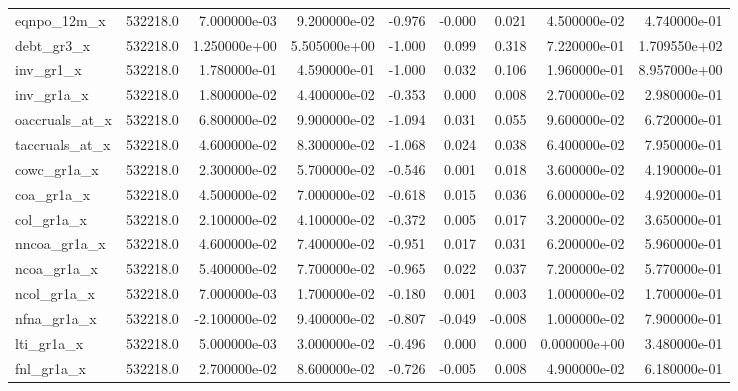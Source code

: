 \documentclass[12pt]{article}
\begin{document}
\begin{landscape}
\begin{longtable}{|l|r|r|r|r|r|r|r|r|}
		eqnpo\_12m\_x            & 532218.0 & 7.000000e-03  & 9.200000e-02 & -0.976     & -0.000      & 0.021       & 4.500000e-02  & 4.740000e-01 \\
		debt\_gr3\_x             & 532218.0 & 1.250000e+00  & 5.505000e+00 & -1.000     & 0.099       & 0.318       & 7.220000e-01  & 1.709550e+02 \\
		inv\_gr1\_x              & 532218.0 & 1.780000e-01  & 4.590000e-01 & -1.000     & 0.032       & 0.106       & 1.960000e-01  & 8.957000e+00 \\
		inv\_gr1a\_x             & 532218.0 & 1.800000e-02  & 4.400000e-02 & -0.353     & 0.000       & 0.008       & 2.700000e-02  & 2.980000e-01 \\
		oaccruals\_at\_x         & 532218.0 & 6.800000e-02  & 9.900000e-02 & -1.094     & 0.031       & 0.055       & 9.600000e-02  & 6.720000e-01 \\
		taccruals\_at\_x         & 532218.0 & 4.600000e-02  & 8.300000e-02 & -1.068     & 0.024       & 0.038       & 6.400000e-02  & 7.950000e-01 \\
		cowc\_gr1a\_x            & 532218.0 & 2.300000e-02  & 5.700000e-02 & -0.546     & 0.001       & 0.018       & 3.600000e-02  & 4.190000e-01 \\
		coa\_gr1a\_x             & 532218.0 & 4.500000e-02  & 7.000000e-02 & -0.618     & 0.015       & 0.036       & 6.000000e-02  & 4.920000e-01 \\
		col\_gr1a\_x             & 532218.0 & 2.100000e-02  & 4.100000e-02 & -0.372     & 0.005       & 0.017       & 3.200000e-02  & 3.650000e-01 \\
		nncoa\_gr1a\_x           & 532218.0 & 4.600000e-02  & 7.400000e-02 & -0.951     & 0.017       & 0.031       & 6.200000e-02  & 5.960000e-01 \\
		ncoa\_gr1a\_x            & 532218.0 & 5.400000e-02  & 7.700000e-02 & -0.965     & 0.022       & 0.037       & 7.200000e-02  & 5.770000e-01 \\
		ncol\_gr1a\_x            & 532218.0 & 7.000000e-03  & 1.700000e-02 & -0.180     & 0.001       & 0.003       & 1.000000e-02  & 1.700000e-01 \\
		nfna\_gr1a\_x            & 532218.0 & -2.100000e-02 & 9.400000e-02 & -0.807     & -0.049      & -0.008      & 1.000000e-02  & 7.900000e-01 \\
		lti\_gr1a\_x             & 532218.0 & 5.000000e-03  & 3.000000e-02 & -0.496     & 0.000       & 0.000       & 0.000000e+00  & 3.480000e-01 \\
		fnl\_gr1a\_x             & 532218.0 & 2.700000e-02  & 8.600000e-02 & -0.726     & -0.005      & 0.008       & 4.900000e-02  & 6.180000e-01 \\

\end{longtable}
\end{landscape}
\end{document}
